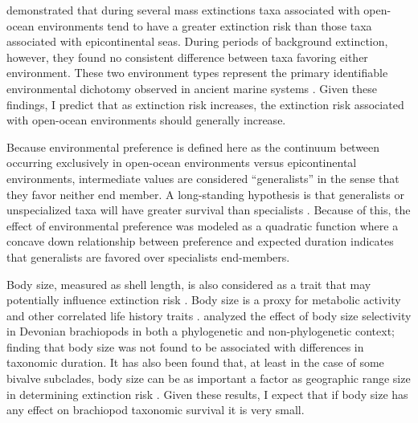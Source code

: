 \documentclass{article}
\begin{document}
\citet{Miller2009a} demonstrated that during several mass extinctions taxa associated with open-ocean environments tend to have a greater extinction risk than those taxa associated with epicontinental seas. During periods of background extinction, however, they found no consistent difference between taxa favoring either environment. These two environment types represent the primary identifiable environmental dichotomy observed in ancient marine systems \citep{Miller2009a,Peters2008,Sheehan2001b}. Given these findings, I predict that as extinction risk increases, the extinction risk associated with open-ocean environments should generally increase. 

Because environmental preference is defined here as the continuum between occurring exclusively in open-ocean environments versus epicontinental environments, intermediate values are considered ``generalists'' in the sense that they favor neither end member. A long-standing hypothesis is that generalists or unspecialized taxa will have greater survival than specialists \citep{Simpson1944,Liow2004a,Liow2007b,Nurnberg2013a,Nurnberg2015,Baumiller1993}. Because of this, the effect of environmental preference was modeled as a quadratic function where a concave down relationship between preference and expected duration indicates that generalists are favored over specialists end-members.

Body size, measured as shell length, is also considered as a trait that may potentially influence extinction risk \citep{Payne2014,Harnik2011}. Body size is a proxy for metabolic activity and other correlated life history traits \citep{Payne2014}. \citet{Harnik2014} analyzed the effect of body size selectivity in Devonian brachiopods in both a phylogenetic and non-phylogenetic context; finding that body size was not found to be associated with differences in taxonomic duration. It has also been found that, at least in the case of some bivalve subclades, body size can be as important a factor as geographic range size in determining extinction risk \citep{Harnik2011}. Given these results, I expect that if body size has any effect on brachiopod taxonomic survival it is very small.
\end{document}
